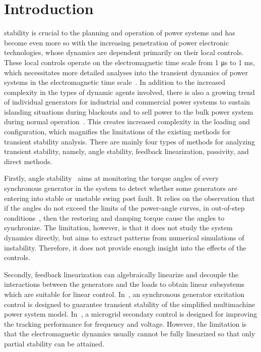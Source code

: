 \section{Introduction}

 stability is crucial to the planning and operation of power systems and has become even more so with the increasing penetration of power electronic technologies, whose dynamics are dependent primarily on their local controls. These local controls operate on the electromagnetic time scale from 1 \unit{\micro s} to 1 \unit{\milli s}, which necessitates more detailed analyses into the transient dynamics of power systems in the electromagnetic time scale~\cite{hatziargyriou2020definition}. In addition to the increased complexity in the types of dynamic agents involved, there is also a growing trend of individual generators for industrial and commercial power systems to sustain islanding situations during blackouts and to sell power to the bulk power system during normal operation~\cite{dai2024practical}. This creates increased complexity in the loading and configuration, which magnifies the limitations of the existing methods for transient stability analysis.
There are mainly four types of methods for analyzing transient stability, namely, angle stability, feedback linearization, passivity, and direct methods. 

Firstly, angle stability~\cite{bera2021identification,dai2024practical} aims at monitoring the torque angles of every synchronous generator in the system to detect whether some generators are entering into stable or unstable swing post fault. It relies on the observation that if the angles do not exceed the limits of the power-angle curves, in out-of-step conditions~\cite{tziouvaras2004out}, then the restoring and damping torque cause the angles to synchronize. The limitation, however, is that it does not study the system dynamics directly, but aims to extract patterns from numerical simulations of instability. Therefore, it does not provide enough insight into the effects of the controls.

Secondly, feedback linearization can algebraically linearize and decouple the interactions between the generators and the loads to obtain linear subsystems which  are suitable for linear control. In~\cite{mahmud2013partial}, an synchronous generator excitation control is designed to guarantee transient stability of the simplified multimachine power system model. In~\cite{bidram2013distributed}, a microgrid secondary control is designed for improving the tracking performance for frequency and voltage. However, the limitation is that the electromagnetic dynamics usually cannot be fully linearized so that only partial stability can be attained.

